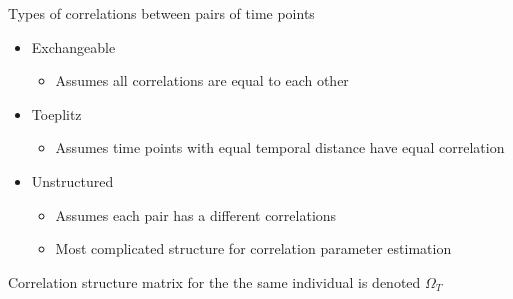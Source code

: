 \documentclass{beamer}
\begin{document}
\begin{frame}[t]{Types of correlations between pairs of time points}

  \begin{itemize}
    \item Exchangeable
    \begin{itemize}
      \item Assumes all correlations are equal to each other
    \end{itemize}
    \item Toeplitz
    \begin{itemize}
      \item Assumes time points with equal temporal distance have equal correlation
    \end{itemize}
    \item Unstructured
    \begin{itemize}
      \item Assumes each pair has a different correlations
      \item Most complicated structure for correlation parameter estimation
    \end{itemize}
  \end{itemize}
  Correlation structure matrix for the the same individual is denoted $\Omega_T$
\end{frame}
\end{document}
